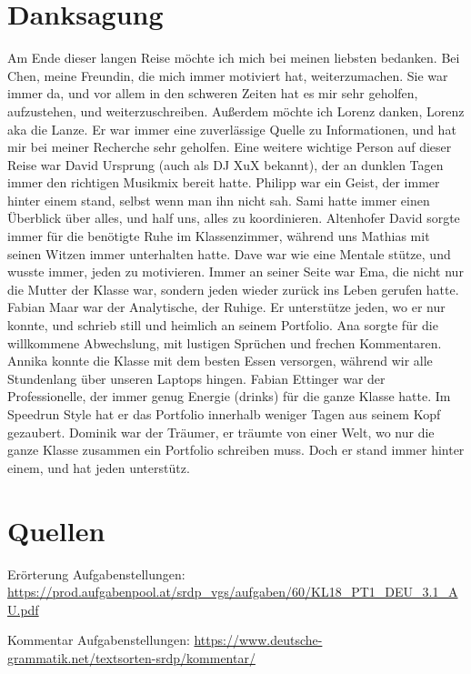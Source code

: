 \section{Danksagung}
Am Ende dieser langen Reise möchte ich mich bei meinen liebsten bedanken. Bei Chen, meine Freundin, die mich immer motiviert hat, weiterzumachen. Sie war immer da, und vor allem in den schweren Zeiten hat es mir sehr geholfen, aufzustehen, und weiterzuschreiben. Außerdem möchte ich Lorenz danken, Lorenz aka die Lanze. Er war immer eine zuverlässige Quelle zu Informationen, und hat mir bei meiner Recherche sehr geholfen. Eine weitere wichtige Person auf dieser Reise war David Ursprung (auch als DJ XuX bekannt), der an dunklen Tagen immer den richtigen Musikmix bereit hatte. Philipp war ein Geist, der immer hinter einem stand, selbst wenn man ihn nicht sah. Sami hatte immer einen Überblick über alles, und half uns, alles zu koordinieren. Altenhofer David sorgte immer für die benötigte Ruhe im Klassenzimmer, während uns Mathias mit seinen Witzen immer unterhalten hatte. Dave war wie eine Mentale stütze, und wusste immer, jeden zu motivieren. Immer an seiner Seite war Ema, die nicht nur die Mutter der Klasse war, sondern jeden wieder zurück ins Leben gerufen hatte. Fabian Maar war der Analytische, der Ruhige. Er unterstütze jeden, wo er nur konnte, und schrieb still und heimlich an seinem Portfolio. Ana sorgte für die willkommene Abwechslung, mit lustigen Sprüchen und frechen Kommentaren. Annika konnte die Klasse mit dem besten Essen versorgen, während wir alle Stundenlang über unseren Laptops hingen.  Fabian Ettinger war der Professionelle, der immer genug Energie (drinks) für die ganze Klasse hatte. Im Speedrun Style hat er das Portfolio innerhalb weniger Tagen aus seinem Kopf gezaubert. Dominik war der Träumer, er träumte von einer Welt, wo nur die ganze Klasse zusammen ein Portfolio schreiben muss. Doch er stand immer hinter einem, und hat jeden unterstütz.  

 
\section{Quellen}

Erörterung Aufgabenstellungen: \href{https://prod.aufgabenpool.at/srdp\_vgs/aufgaben/60/KL18\_PT1\_DEU\_3.1\_AU.pdf}{https://prod.aufgabenpool.at/srdp\_vgs/aufgaben/60/KL18\_PT1\_DEU\_3.1\_AU.pdf}  

Kommentar Aufgabenstellungen:  \href{https://www.deutsche-grammatik.net/textsorten-srdp/kommentar/ }{https://www.deutsche-grammatik.net/textsorten-srdp/kommentar/ }

